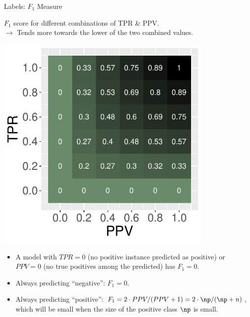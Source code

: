 \documentclass[11pt,compress,t,notes=noshow, xcolor=table]{beamer}
\newenvironment{knitrout}{}{} %
\begin{document}
\begin{vbframe}{Labels: $F_1$ Measure}
\begin{minipage}[c]{0.5\textwidth}
  $F_1$ score for different combinations of TPR \& PPV. \\
  $\rightarrow$ Tends more towards the lower of the two combined values.
\end{minipage}%
\begin{minipage}[c]{0.5\textwidth}
  \centering
  \includegraphics[width=0.8\textwidth]{figure/eval_mclass_roc.pdf}
\end{minipage}

% 
% 

\begin{itemize}
  \item A model with $TPR=0$ (no positive instance predicted as positive) or 
  $PPV=0$ (no true positives among the predicted) has $F_1 = 0$.
  \item Always predicting \enquote{negative}: $F_1 = 0$.
  \item Always predicting \enquote{positive}: $F_1 = 2 \cdot PPV / (PPV + 1) = 
  2 \cdot \np / (\np + n)$,\\ 
  which will be small when the size of the positive class $\np$ is small.
\end{itemize}

\end{vbframe}
\end{document}
